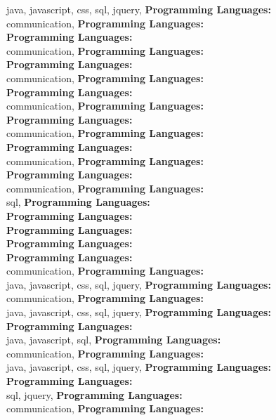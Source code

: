 java, javascript, css, sql, jquery, \textbf{Programming Languages:} \\
communication, \textbf{Programming Languages:} \\
\textbf{Programming Languages:} \\
communication, \textbf{Programming Languages:} \\
\textbf{Programming Languages:} \\
communication, \textbf{Programming Languages:} \\
\textbf{Programming Languages:} \\
communication, \textbf{Programming Languages:} \\
\textbf{Programming Languages:} \\
communication, \textbf{Programming Languages:} \\
\textbf{Programming Languages:} \\
communication, \textbf{Programming Languages:} \\
\textbf{Programming Languages:} \\
communication, \textbf{Programming Languages:} \\
sql, \textbf{Programming Languages:} \\
\textbf{Programming Languages:} \\
\textbf{Programming Languages:} \\
\textbf{Programming Languages:} \\
\textbf{Programming Languages:} \\
communication, \textbf{Programming Languages:} \\
java, javascript, css, sql, jquery, \textbf{Programming Languages:} \\
communication, \textbf{Programming Languages:} \\
java, javascript, css, sql, jquery, \textbf{Programming Languages:} \\
\textbf{Programming Languages:} \\
java, javascript, sql, \textbf{Programming Languages:} \\
communication, \textbf{Programming Languages:} \\
java, javascript, css, sql, jquery, \textbf{Programming Languages:} \\
\textbf{Programming Languages:} \\
sql, jquery, \textbf{Programming Languages:} \\
communication, \textbf{Programming Languages:} \\
